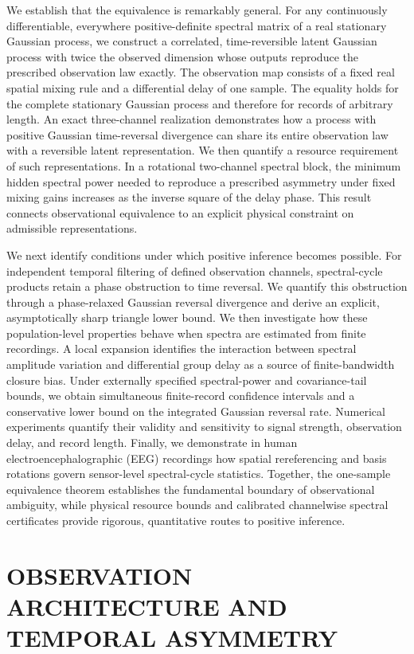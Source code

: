 \documentclass[aps,pre,reprint,amsmath,amssymb,superscriptaddress]{revtex4-2}
\begin{document}
We establish that the equivalence is remarkably general. For any continuously differentiable, everywhere positive-definite spectral matrix of a real stationary Gaussian process, we construct a correlated, time-reversible latent Gaussian process with twice the observed dimension whose outputs reproduce the prescribed observation law exactly. The observation map consists of a fixed real spatial mixing rule and a differential delay of one sample. The equality holds for the complete stationary Gaussian process and therefore for records of arbitrary length. An exact three-channel realization demonstrates how a process with positive Gaussian time-reversal divergence can share its entire observation law with a reversible latent representation. We then quantify a resource requirement of such representations. In a rotational two-channel spectral block, the minimum hidden spectral power needed to reproduce a prescribed asymmetry under fixed mixing gains increases as the inverse square of the delay phase. This result connects observational equivalence to an explicit physical constraint on admissible representations.

We next identify conditions under which positive inference becomes possible. For independent temporal filtering of defined observation channels, spectral-cycle products retain a phase obstruction to time reversal. We quantify this obstruction through a phase-relaxed Gaussian reversal divergence and derive an explicit, asymptotically sharp triangle lower bound. We then investigate how these population-level properties behave when spectra are estimated from finite recordings. A local expansion identifies the interaction between spectral amplitude variation and differential group delay as a source of finite-bandwidth closure bias. Under externally specified spectral-power and covariance-tail bounds, we obtain simultaneous finite-record confidence intervals and a conservative lower bound on the integrated Gaussian reversal rate. Numerical experiments quantify their validity and sensitivity to signal strength, observation delay, and record length. Finally, we demonstrate in human electroencephalographic (EEG) recordings how spatial rereferencing and basis rotations govern sensor-level spectral-cycle statistics. Together, the one-sample equivalence theorem establishes the fundamental boundary of observational ambiguity, while physical resource bounds and calibrated channelwise spectral certificates provide rigorous, quantitative routes to positive inference.

\section{OBSERVATION ARCHITECTURE AND TEMPORAL ASYMMETRY}
\end{document}
